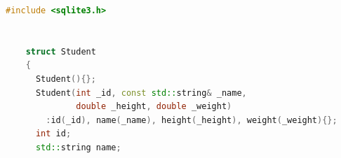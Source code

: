 \documentclass [11pt,a4paper,dvipdfmx] {jarticle}
\begin{document}
\begin{lstlisting}[language=C++]
    #include <sqlite3.h>                                                                                                                                                                                                                                                            
                                                                                                                                                                                                                                                                                    
                                                                                                                                                                                                                                                                                    
    struct Student                                                                                                                                                                                                                                                                  
    {                                                                                                                                                                                                                                                                               
      Student(){};                                                                                                                                                                                                                                                                  
      Student(int _id, const std::string& _name,
              double _height, double _weight)                                                                                                                                                                                                    
        :id(_id), name(_name), height(_height), weight(_weight){};                                                                                                                                                                                                                  
      int id;                                                                                                                                                                                                                                                                       
      std::string name;                                                                                                                                                                                                                                                             

\end{lstlisting}
\end{document}
